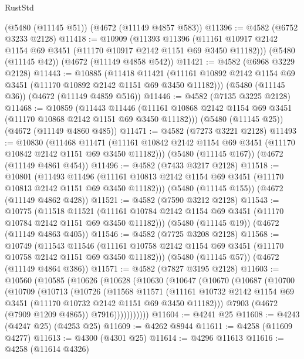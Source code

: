 \begin{lexlean}{RustStd}
\begin{coremodule}
    (@5480 (@11145 @51))
    (@4672 (@11149 @4857 @583))
@11396 := @4582 (@6752 @3233 @2128)
@11418 := @10909
    (@11393
      @11396
      (@11161 @10917 @2142 @1154 @69 @3451 (@11170 @10917 @2142 @1151 @69 @3450 @11182)))
    (@5480 (@11145 @42))
    (@4672 (@11149 @4858 @542))
@11421 := @4582 (@6968 @3229 @2128)
@11443 := @10885
    (@11418
      @11421
      (@11161 @10892 @2142 @1154 @69 @3451 (@11170 @10892 @2142 @1151 @69 @3450 @11182)))
    (@5480 (@11145 @36))
    (@4672 (@11149 @4859 @516))
@11446 := @4582 (@7135 @3225 @2128)
@11468 := @10859
    (@11443
      @11446
      (@11161 @10868 @2142 @1154 @69 @3451 (@11170 @10868 @2142 @1151 @69 @3450 @11182)))
    (@5480 (@11145 @25))
    (@4672 (@11149 @4860 @485))
@11471 := @4582 (@7273 @3221 @2128)
@11493 := @10830
    (@11468
      @11471
      (@11161 @10842 @2142 @1154 @69 @3451 (@11170 @10842 @2142 @1151 @69 @3450 @11182)))
    (@5480 (@11145 @167))
    (@4672 (@11149 @4861 @454))
@11496 := @4582 (@7433 @3217 @2128)
@11518 := @10801
    (@11493
      @11496
      (@11161 @10813 @2142 @1154 @69 @3451 (@11170 @10813 @2142 @1151 @69 @3450 @11182)))
    (@5480 (@11145 @155))
    (@4672 (@11149 @4862 @428))
@11521 := @4582 (@7590 @3212 @2128)
@11543 := @10775
    (@11518
      @11521
      (@11161 @10784 @2142 @1154 @69 @3451 (@11170 @10784 @2142 @1151 @69 @3450 @11182)))
    (@5480 (@11145 @19))
    (@4672 (@11149 @4863 @405))
@11546 := @4582 (@7725 @3208 @2128)
@11568 := @10749
    (@11543
      @11546
      (@11161 @10758 @2142 @1154 @69 @3451 (@11170 @10758 @2142 @1151 @69 @3450 @11182)))
    (@5480 (@11145 @57))
    (@4672 (@11149 @4864 @386))
@11571 := @4582 (@7827 @3195 @2128)
@11603 := @10560
    (@10585
      (@10626
        (@10628
          (@10630
            (@10647
              (@10670
                (@10687
                  (@10700
                    (@10709
                      (@10713
                        (@10726
                          (@11568
                            @11571
                            (@11161
                              @10732
                              @2142
                              @1154
                              @69
                              @3451
                              (@11170 @10732 @2142 @1151 @69 @3450 @11182)))
                          @7903
                          (@4672 (@7909 @1209 @4865))
                          @7916)))))))))))
@11604 := @4241 @25
@11608 := @4243 (@4247 @25) (@4253 @25)
@11609 := @4262 @8944
@11611 := @4258 (@11609 @4277)
@11613 := @4300 (@4301 @25)
@11614 := @4296 @11613
@11616 := @4258 (@11614 @4326)

\end{coremodule}
\end{lexlean}

